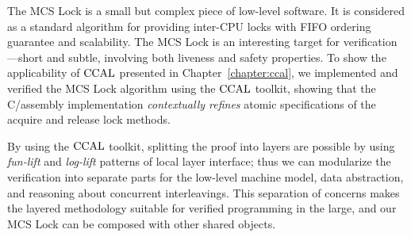 


The MCS Lock is a small but complex piece of low-level software.
It is considered as a standard algorithm for providing inter-CPU locks with FIFO ordering guarantee and scalability.
The MCS Lock is an interesting target for verification---short and subtle, involving both liveness and safety properties. 
To show the applicability of $\mathrm{CCAL}$ presented in Chapter~\ref{chapter:ccal},
we implemented and verified the MCS Lock algorithm using the $\mathrm{CCAL}$ toolkit, 
showing that the C/assembly implementation {\em contextually refines} atomic specifications of the acquire and release lock methods.

By using the $\mathrm{CCAL}$ toolkit, splitting the proof into layers are possible by using \textit{fun-lift} and \textit{log-lift} patterns of local layer interface;
thus we can modularize the verification into separate parts for the low-level machine model, data abstraction, and reasoning about concurrent interleavings.
This separation of concerns makes the layered methodology suitable for verified programming in the large, and our 
MCS Lock can be composed with other shared objects.

